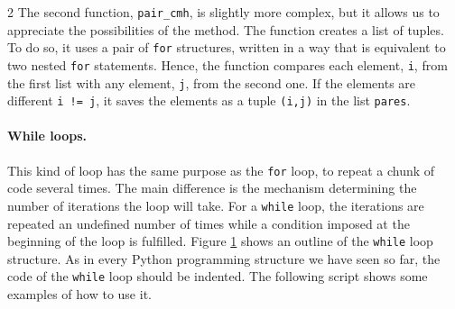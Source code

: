 \begin{paracol}{2}
The second function, \texttt{pair_cmh}, is slightly more complex, but it allows us to appreciate the possibilities of the method. The function creates a list of tuples. To do so, it uses a pair of  \texttt{for} structures, written in a way that is equivalent to two nested \texttt{for} statements. Hence, the function compares each element, \texttt{i}, from the first list with any element, \texttt{j}, from the second one. If the elements are different \texttt{i != j}, it saves the elements as a tuple \texttt{(i,j)} in the list \texttt{pares}. 

\paragraph{While loops.} This kind of loop has the same purpose as the \texttt{for} loop, to repeat a chunk of code several times. The main difference is the mechanism determining the number of iterations the loop will take. For a \texttt{while} loop, the iterations are repeated an undefined number of times while a condition imposed at the beginning of the loop is fulfilled. Figure \ref{fig:while} shows an outline of the \texttt{while} loop structure. As in every Python programming structure we have seen so far, the code of the \texttt{while} loop should be indented. The following script shows some examples of how to use it.   

\end{paracol}

\begin{figure}
\centering
{}
\label{fig:while}
\end{figure}

